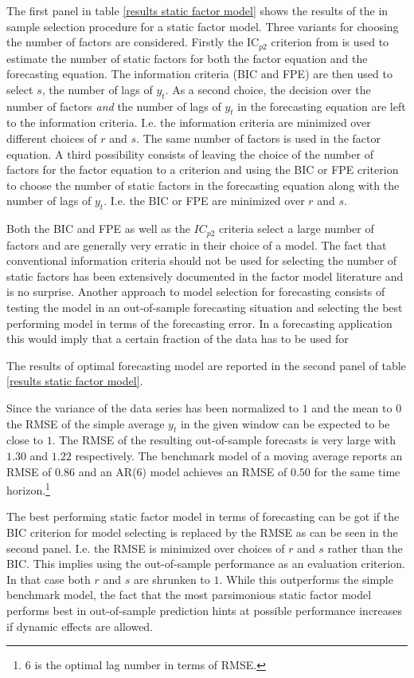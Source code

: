 \documentclass[12pt]{article}
\begin{document}
The first panel in table \ref{results static factor model} shows the results of the in sample selection procedure for a static factor model. Three variants for choosing the number of factors are considered. Firstly the IC$_{p2}$ criterion from \citet{bai2002determining} is used to estimate the number of static factors for both the factor equation and the forecasting equation. The information criteria (BIC and FPE) are then used to select $s$, the number of lags of $y_t$.
As a second choice, the decision over the number of factors \textit{and} the number of lags of $y_t$ in the forecasting equation are left to the information criteria. I.e. the information criteria are minimized over different choices of $r$ and $s$. The same number of factors is used in the factor equation.
A third possibility consists of leaving the choice of the number of factors for the factor equation to a \citet{bai2002determining} criterion and using the BIC or FPE criterion to choose the number of static factors in the forecasting equation along with the number of lags of $y_t$. I.e. the BIC or FPE are minimized over $r$ and $s$.

Both the BIC and FPE as well as the $IC_{p2}$ criteria select a large number of factors and are generally very erratic in their choice of a model. The fact that conventional information criteria should not be used for selecting the number of static factors has been extensively documented in the factor model literature and is no surprise. Another approach to model selection for forecasting consists of testing the model in an out-of-sample forecasting situation and selecting the best performing model in terms of the forecasting error. In a forecasting application this would imply that a certain fraction of the data has to be used for 

The results of optimal forecasting model are reported in the second panel of table \ref{results static factor model}.

Since the variance of the data series has been normalized to $1$ and the mean to $0$ the RMSE of the simple average $y_t$ in the given window can be expected to be close to $1$. The RMSE of the resulting out-of-sample forecasts is very large with $1.30$ and $1.22$ respectively. The benchmark model of a moving average reports an RMSE of $0.86$ and an AR(6) model achieves an RMSE of $0.50$ for the same time horizon.\footnote{$6$ is the optimal lag number in terms of RMSE.}

The best performing static factor model in terms of forecasting can be got if the BIC criterion for model selecting is replaced by the RMSE as can be seen in the second panel. I.e. the RMSE is minimized over choices of $r$ and $s$ rather than the BIC. This implies using the out-of-sample performance as an evaluation criterion. In that case both $r$ and $s$ are shrunken to $1$. While this outperforms the simple benchmark model, the fact that the most parsimonious static factor model performs best in out-of-sample prediction hints at possible performance increases if dynamic effects are allowed.
\end{document}
